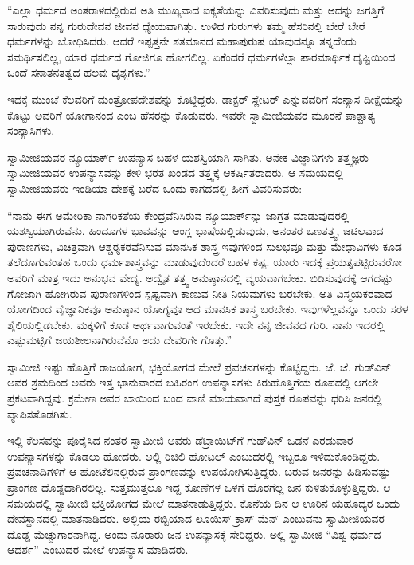  “ಎಲ್ಲಾ ಧರ್ಮದ ಅಂತರಾಳದಲ್ಲಿರುವ ಅತಿ ಮುಖ್ಯವಾದ ಐಕ್ಯತೆಯನ್ನು ವಿವರಿಸುವುದು ಮತ್ತು ಅದನ್ನು ಜಗತ್ತಿಗೆ ಸಾರುವುದು ನನ್ನ ಗುರುದೇವನ ಜೀವನ ಧ್ಯೇಯವಾಗಿತ್ತು. ಉಳಿದ ಗುರುಗಳು ತಮ್ಮ ಹೆಸರಿನಲ್ಲಿ ಬೇರೆ ಬೇರೆ ಧರ್ಮಗಳನ್ನು ಬೋಧಿಸಿದರು. ಆದರೆ ಇಪ್ಪತ್ತನೇ ಶತಮಾನದ ಮಹಾಪುರುಷ ಯಾವುದನ್ನೂ ತನ್ನದೆಂದು ಸಮರ್ಥಿಸಲಿಲ್ಲ, ಯಾರ ಧರ್ಮದ ಗೋಜಿಗೂ ಹೋಗಲಿಲ್ಲ. ಏಕೆಂದರೆ ಧರ್ಮಗಳೆಲ್ಲಾ ಪಾರಮಾರ್ಥಿಕ ದೃಷ್ಟಿಯಿಂದ ಒಂದೆ ಸನಾತನತತ್ವದ ಹಲವು ದೃಶ್ಯಗಳು.” 

 ಇದಕ್ಕೆ ಮುಂಚೆ ಕೆಲವರಿಗೆ ಮಂತ್ರೋಪದೇಶವನ್ನು ಕೊಟ್ಟಿದ್ದರು. ಡಾಕ್ಟರ್ ಸ್ಲೇಟರ್ ಎನ್ನುವವರಿಗೆ ಸಂನ್ಯಾಸ ದೀಕ್ಷೆಯನ್ನು ಕೊಟ್ಟು ಅವರಿಗೆ ಯೋಗಾನಂದ ಎಂಬ ಹೆಸರನ್ನು ಕೊಡುವರು. ಇವರೇ ಸ್ವಾಮೀಜಿಯವರ ಮೂರನೆ ಪಾಶ್ಚಾತ್ಯ ಸಂನ್ಯಾಸಿಗಳು. 

 ಸ್ವಾಮೀಜಿಯವರ ನ್ಯೂಯಾರ್ಕ್ ಉಪನ್ಯಾಸ ಬಹಳ ಯಶಸ್ವಿಯಾಗಿ ಸಾಗಿತು. ಅನೇಕ ವಿಜ್ಞಾನಿಗಳು ತತ್ತ್ವಜ್ಞರು ಸ್ವಾಮೀಜಿಯವರ ಉಪನ್ಯಾಸವನ್ನು ಕೇಳಿ ಭರತ ಖಂಡದ ತತ್ತ್ವಕ್ಕೆ ಆಕರ್ಷಿತರಾದರು. ಆ ಸಮಯದಲ್ಲಿ ಸ್ವಾಮೀಜಿಯವರು ಇಂಡಿಯಾ ದೇಶಕ್ಕೆ ಬರೆದ ಒಂದು ಕಾಗದದಲ್ಲಿ ಹೀಗೆ ವಿವರಿಸುವರು: 

 “ನಾನು ಈಗ ಅಮೇರಿಕಾ ನಾಗರಿಕತೆಯ ಕೇಂದ್ರವೆನಿಸಿರುವ ನ್ಯೂಯಾರ್ಕ್‍ನ್ನು ಜಾಗ್ರತ ಮಾಡುವುದರಲ್ಲಿ ಯಶಸ್ವಿಯಾಗಿರುವೆನು. ಹಿಂದೂಗಳ ಭಾವವನ್ನು ಆಂಗ್ಲ ಭಾಷೆಯಲ್ಲಿಡುವುದು, ಅನಂತರ ಒಣತತ್ತ್ವ, ಜಟಿಲವಾದ ಪುರಾಣಗಳು, ವಿಚಿತ್ರವಾಗಿ ಆಶ್ಚರ‍್ಯಕರವೆನಿಸುವ ಮಾನಸಿಕ ಶಾಸ್ತ್ರ ಇವುಗಳಿಂದ ಸುಲಭವೂ ಮತ್ತು ಮೇಧಾವಿಗಳು ಕೂಡ ತಲೆದೂಗುವಂತಹ ಒಂದು ಧರ್ಮಶಾಸ್ತ್ರವನ್ನು ಮಾಡುವುದೆಂದರೆ ಬಹಳ ಕಷ್ಟ. ಯಾರು ಇದಕ್ಕೆ ಪ್ರಯತ್ನಪಟ್ಟಿರುವರೋ ಅವರಿಗೆ ಮಾತ್ರ ಇದು ಅನುಭವ ವೇದ್ಯ. ಅದ್ವೈತ ತತ್ತ್ವ ಅನುಷ್ಠಾನದಲ್ಲಿ ವ್ಯಯವಾಗಬೇಕು. ಬಿಡಿಸುವುದಕ್ಕೆ ಆಗದಷ್ಟು ಗೋಜಾಗಿ ಹೋಗಿರುವ ಪುರಾಣಗಳಿಂದ ಸ್ಪಷ್ಟವಾಗಿ ಕಾಣುವ ನೀತಿ ನಿಯಮಗಳು ಬರಬೇಕು. ಅತಿ ವಿಸ್ಮಯಕರವಾದ ಯೋಗದಿಂದ ವೈಜ್ಞಾನಿಕವೂ ಅನುಷ್ಠಾನ ಯೋಗ್ಯವೂ ಆದ ಮಾನಸಿಕ ಶಾಸ್ತ್ರ ಬರಬೇಕು. ಇವುಗಳೆಲ್ಲವನ್ನೂ ಒಂದು ಸರಳ ಶೈಲಿಯಲ್ಲಿಡಬೇಕು. ಮಕ್ಕಳಿಗೆ ಕೂಡ ಅರ್ಥವಾಗುವಂತೆ ಇರಬೇಕು. ಇದೇ ನನ್ನ ಜೀವನದ ಗುರಿ. ನಾನು ಇದರಲ್ಲಿ ಎಷ್ಟುಮಟ್ಟಿಗೆ ಜಯಶೀಲನಾಗಿರುವೆನೊ ಅದು ದೇವರಿಗೇ ಗೊತ್ತು.” 

 ಸ್ವಾಮೀಜಿ ಇಷ್ಟು ಹೊತ್ತಿಗೆ ರಾಜಯೋಗ, ಭಕ್ತಿಯೋಗದ ಮೇಲೆ ಪ್ರವಚನಗಳನ್ನು ಕೊಟ್ಟಿದ್ದರು. ಜೆ. ಜೆ. ಗುಡ್‍ವಿನ್ ಅವರ ಶ್ರಮದಿಂದ ಅವರು ಇತ್ತ ಭಾನುವಾರದ ಬಹಿರಂಗ ಉಪನ್ಯಾಸಗಳು ಕಿರುಹೊತ್ತಿಗೆಯ ರೂಪದಲ್ಲಿ ಆಗಲೇ ಪ್ರಕಟವಾಗಿದ್ದವು. ಕ್ರಮೇಣ ಅವರ ಬಾಯಿಂದ ಬಂದ ವಾಣಿ ಮಾಯವಾಗದೆ ಪುಸ್ತಕ ರೂಪವನ್ನು ಧರಿಸಿ ಜನರಲ್ಲಿ ವ್ಯಾಪಿಸತೊಡಗಿತು. 

 ಇಲ್ಲಿ ಕೆಲಸವನ್ನು ಪೂರೈಸಿದ ನಂತರ ಸ್ವಾಮೀಜಿ ಅವರು ಡೆಟ್ರಾಯಿಟ್‍ಗೆ ಗುಡ್‍ವಿನ್ ಒಡನೆ ಎರಡುವಾರ ಉಪನ್ಯಾಸಗಳನ್ನು ಕೊಡಲು ಹೋದರು. ಅಲ್ಲಿ ರಿಚಿಲಿ ಹೋಟಲ್ ಎಂಬುದರಲ್ಲಿ ಇಬ್ಬರೂ ಇಳಿದುಕೊಂಡಿದ್ದರು. ಪ್ರವಚನಾದಿಗಳಿಗೆ ಆ ಹೋಟೆಲಿನಲ್ಲಿರುವ ಪ್ರಾಂಗಣವನ್ನು ಉಪಯೋಗಿಸುತ್ತಿದ್ದರು. ಬರುವ ಜನರನ್ನು ಹಿಡಿಸುವಷ್ಟು ಪ್ರಾಂಗಣ ದೊಡ್ಡದಾಗಿರಲಿಲ್ಲ. ಸುತ್ತಮುತ್ತಲೂ ಇದ್ದ ಕೋಣೆಗಳ ಒಳಗೆ ಹೊರಗೆಲ್ಲ ಜನ ಕುಳಿತುಕೊಳ್ಳುತ್ತಿದ್ದರು. ಆ ಸಮಯದಲ್ಲಿ ಸ್ವಾಮೀಜಿ ಭಕ್ತಿಯೋಗದ ಮೇಲೆ ಮಾತನಾಡುತ್ತಿದ್ದರು. ಕೊನೆಯ ದಿನ ಆ ಊರಿನ ಯಹೂದ್ಯರ ಒಂದು ದೇವಸ್ಥಾನದಲ್ಲಿ ಮಾತನಾಡಿದರು. ಅಲ್ಲಿಯ ರಬ್ಬಿಯಾದ ಲೂಯಿಸ್ ಕ್ರಾಸ್ ಮೆನ್ ಎಂಬುವನು ಸ್ವಾಮೀಜಿಯವರ ದೊಡ್ಡ ಮೆಚ್ಚುಗಾರನಾಗಿದ್ದ. ಅಂದು ನೂರಾರು ಜನ ಉಪನ್ಯಾಸಕ್ಕೆ ಸೇರಿದ್ದರು. ಅಲ್ಲಿ ಸ್ವಾಮೀಜಿ “ವಿಶ್ವ ಧರ್ಮದ ಆದರ್ಶ” ಎಂಬುದರ ಮೇಲೆ ಉಪನ್ಯಾಸ ಮಾಡಿದರು. 

